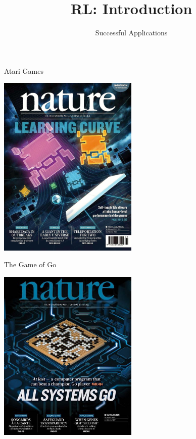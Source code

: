


\title[ML-RL: Big Picture]{RL: Introduction}
\subtitle{Successful Applications}




	
	\maketitle

\begin{frame}[c]{Atari Games }

\centering
\includegraphics[width=0.5\textwidth]{images/nature_atari_rl.jpg}


\end{frame}
\begin{frame}[c]{The Game of Go }
	
	\centering
	\includegraphics[width=0.5\textwidth]{images/nature_go_rl.jpeg}
	
	
\end{frame}
